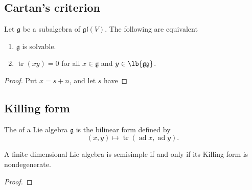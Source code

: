 \documentclass{article}
\DeclarePairedDelimiter\lb\lbrack\rbrack
\DeclareMathOperator{\tr}{tr}
\DeclareMathOperator{\ad}{ad}
\newcommand*\frkg{{\ensuremath{\mathfrak{g}}}}
\newcommand*\glalg{\ensuremath{\mathfrak{gl}}}
\begin{document}
\subsection{Cartan's criterion}

\begin{theorem}
    Let $\frkg$ be a subalgebra of $\glalg(V)$.
    The following are equivalent
    \begin{enumerate}[label=(\alph*)]
        \item
            $\frkg$ is solvable.
        \item 
            $\tr(xy) = 0$ for all $x \in \frkg$ and $y \in \lb{\frkg\frkg}$.
    \end{enumerate}
\end{theorem}

\begin{proof}
    Put $x = s + n$, and let $s$ have 
\end{proof}

\subsection{Killing form}

\begin{definition}
    The  of a Lie algebra $\frkg$ is the bilinear form defined by
    \[
        (x, y)
        \mapsto
        \tr(\ad x, \ad y).
    \]
\end{definition}

\begin{proposition}
    A finite dimensional Lie algebra is semisimple if and only if its Killing form is nondegenerate.
\end{proposition}

\begin{proof}
\end{proof}
\end{document}
